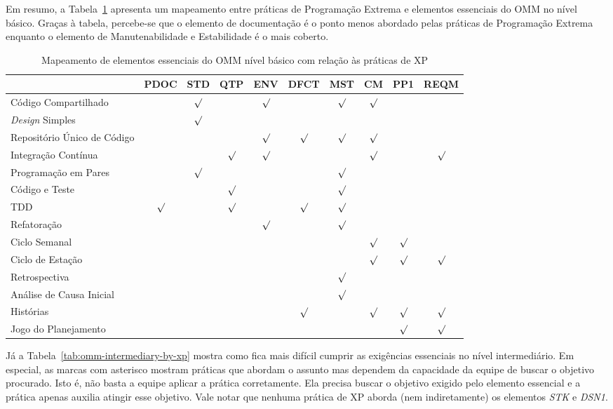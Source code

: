 Em resumo, a Tabela~\ref{tab:omm-basic-by-xp} apresenta um mapeamento
entre práticas de Programação Extrema e elementos essenciais do OMM no
nível básico. Graças à tabela, percebe-se que o elemento de
documentação é o ponto menos abordado pelas práticas de Programação
Extrema enquanto o elemento de Manutenabilidade e Estabilidade é o
mais coberto.

\begin{table}
  \centering
  \begin{tabular}{|p{4cm}|c|c|c|c|c|c|c|c|c|}
    \hline
    & PDOC & STD & QTP & ENV & DFCT & MST & CM & PP1 & REQM \\
    \hline
    Código Compartilhado & & $\surd$ & & $\surd$ & & $\surd$ & $\surd$ & & \\
    \hline
    \textit{Design} Simples & & $\surd$ & & & & & & & \\
    \hline
    Repositório Único de Código & & & & $\surd$ & $\surd$ & $\surd$ & $\surd$ & & \\
    \hline
    Integração Contínua & & & $\surd$ & $\surd$ & & & $\surd$ & & $\surd$ \\
    \hline
    Programação em Pares & & $\surd$ & & & & $\surd$ & & & \\
    \hline
    Código e Teste & & & $\surd$ & & & $\surd$ & & & \\
    \hline
    TDD & $\surd$ & & $\surd$ & & $\surd$ & $\surd$ & & & \\
    \hline
    Refatoração & & & & $\surd$ & & $\surd$ & & & \\
    \hline
    Ciclo Semanal & & & & & & & $\surd$ & $\surd$ & \\
    \hline
    Ciclo de Estação & & & & & & & $\surd$ & $\surd$ & $\surd$ \\
    \hline
    Retrospectiva & & & & & & $\surd$ & & & \\
    \hline
    Análise de Causa Inicial & & & & & & $\surd$ & & & \\
    \hline
    Histórias & & & & & $\surd$ & & $\surd$ & $\surd$ & $\surd$ \\
    \hline
    Jogo do Planejamento & & & & & & & & $\surd$ & $\surd$ \\
    \hline
  \end{tabular}
  \caption{Mapeamento de elementos essenciais do OMM nível básico com relação às práticas de XP}
  \label{tab:omm-basic-by-xp}
\end{table}

Já a Tabela~\ref{tab:omm-intermediary-by-xp} mostra como fica mais
difícil cumprir as exigências essenciais no nível intermediário. Em
especial, as marcas com asterisco mostram práticas que abordam o
assunto mas dependem da capacidade da equipe de buscar o objetivo
procurado. Isto é, não basta a equipe aplicar a prática
corretamente. Ela precisa buscar o objetivo exigido pelo elemento
essencial e a prática apenas auxilia atingir esse objetivo. Vale notar
que nenhuma prática de XP aborda (nem indiretamente) os elementos
\textit{STK} e \textit{DSN1}.

